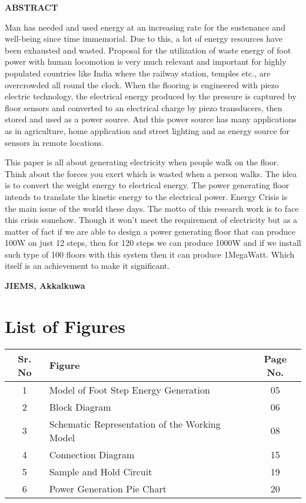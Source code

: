 \documentclass[12pt]{article}
\begin{document}
\begin{center}
    \textbf{\large ABSTRACT}
\end{center}

Man has needed and used energy at an increasing rate for the sustenance and well-being since time immemorial. Due to this, a lot of energy resources have been exhausted and wasted. Proposal for the utilization of waste energy of foot power with human locomotion is very much relevant and important for highly populated countries like India where the railway station, temples etc., are overcrowded all round the clock. When the flooring is engineered with piezo electric technology, the electrical energy produced by the pressure is captured by floor sensors and converted to an electrical charge by piezo transducers, then stored and used as a power source. And this power source has many applications as in agriculture, home application and street lighting and as energy source for sensors in remote locations.

This paper is all about generating electricity when people walk on the floor. Think about the forces you exert which is wasted when a person walks. The idea is to convert the weight energy to electrical energy. The power generating floor intends to translate the kinetic energy to the electrical power. Energy Crisis is the main issue of the world these days. The motto of this research work is to face this crisis somehow. Though it won’t meet the requirement of electricity but as a matter of fact if we are able to design a power generating floor that can produce 100W on just 12 steps, then for 120 steps we can produce 1000W and if we install such type of 100 floors with this system then it can produce 1MegaWatt. Which itself is an achievement to make it significant.

\vspace{1cm}

\begin{flushright}
    \textbf{JIEMS, Akkalkuwa}
\end{flushright}

   \newpage



\section*{List of Figures}
\begin{table}[h!]
\centering
\begin{tabular}{|c|p{8cm}|c|}
\hline
\textbf{Sr. No} & \textbf{Figure} & \textbf{Page No.} \\ \hline
1 & Model of Foot Step Energy Generation & 05 \\ \hline
2 & Block Diagram & 06 \\ \hline
3 & Schematic Representation of the Working Model & 08 \\ \hline
4 & Connection Diagram & 15 \\ \hline
5 & Sample and Hold Circuit & 19 \\ \hline
6 & Power Generation Pie Chart & 20 \\ \hline
\end{tabular}
\end{table}
\end{document}
